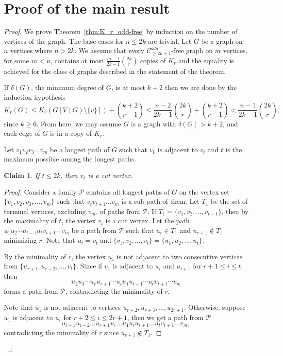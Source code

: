 \documentclass[a4paper,11pt]{article}
\newtheorem{claim}[theorem]{Claim}
\def\C{\mathcal C}
\def\P{\mathcal P}
\begin{document}
\section{Proof of the main result}
\begin{proof}
We prove Theorem~\ref{thm:K_r_odd-free} by induction on the number of vertices of the graph. 
The base cases for $n\leq 2k$ are trivial. Let $G$ be a graph on $n$ vertices where $n>2k$.  We assume that every $\C^{odd}_{\geq 2k+1}$-free graph on $m$ vertices, for some $m<n$, contains at most $\frac{m-1}{2k-1}\binom{2k}{r}$ copies of $K_r$ and the equality is achieved for the class of graphs described in the statement of the theorem.

If $\delta(G)$, the minimum degree of $G$, is at most $k+2$ then we are done by the induction hypothesis
\[
K_r(G)\leq K_r(G[V(G) \setminus \{v\}])+\binom{k+2}{r-1}\leq \frac{n-2}{2k-1}\binom{2k}{r}+\binom{k+2}{r-1}< \frac{n-1}{2k-1}\binom{2k}{r}, 
\]
since $k\geq 6$.
From here, we may assume $G$ is a graph with $\delta(G)>k+2$, and each edge of $G$ is in a copy of $K_r$. 

Let $v_1v_2v_3\dots v_m$ be a longest path of $G$ such that $v_1$ is adjacent to $v_t$ and $t$ is the maximum possible among the longest paths.


\begin{claim}\label{claim:Cut_vertex}
If $t\leq 2k$, then $v_t$ is a cut vertex. 
\end{claim}
\begin{proof}
Consider a family $\P$ contains all longest paths of $G$ on the vertex set $\{v_1,v_2,v_3,\dots,v_m\}$ such that $v_tv_{t+1}\dots v_m$ is a sub-path of them. Let  $T_1$ be  the set of terminal vertices, excluding $v_m$, of paths from $\P$.  If $T_1=\{v_1,v_2,\dots,v_{t-1}\}$, then by the maximality of $t$, the vertex $v_t$ is a cut vertex. 
Let the path $u_1u_2\cdots u_{t-1}u_tv_{t+1}\cdots v_m$ be a path from $\P$ such that $u_r\in T_1$ and $u_{r+1}\notin T_1$  minimizing $r$. 
Note that $u_t=v_t$ and $\{v_1,v_2,\dots,v_t\}=\{u_1,u_2,\dots,u_t\}$. 

By the minimality of $r$, the vertex $u_1$ is not adjacent to two consecutive vertices from $\{u_{r+1},u_{r+2},\dots,v_t\}$. Since if $v_1$ is adjacent to $u_i$ and $u_{i+1}$ for  $r+1\leq i \leq t$, then 
\[
u_2u_3\cdots u_ru_{r+1}\cdots u_iu_1u_{i+1}\cdots u_t v_{t+1}\cdots v_m 
\]
forms a path from  $\P$, contradicting the minimality of $r$. 

Note that $u_1$ is not adjacent to vertices $u_{r+2},u_{r+3},\dots ,u_{2r+1}$. 
Otherwise, suppose $u_1$ is adjacent to $u_i$ for $r+2\leq i\leq 2r+1$, then  we get a path from $\P$
\[
u_{i-1}u_{i-2}\dots u_{r+1}u_{r}\dots u_1u_{i}u_{i+1}\dots u_t v_{t+1} \dots v_{m},
\]
contradicting the minimality of $r$ since  $u_{r+1}\notin T_1$.


\end{proof}
\end{proof}
\end{document}
